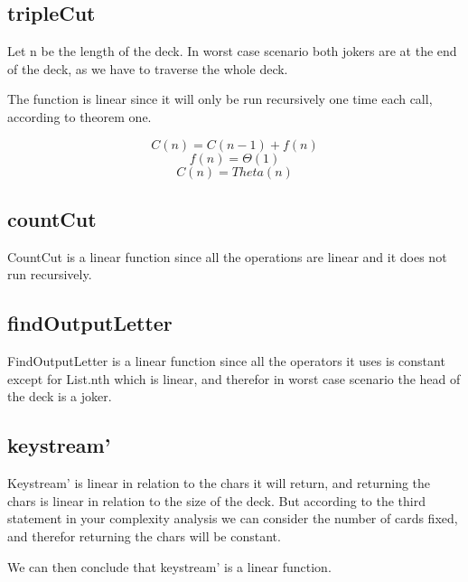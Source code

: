 \documentclass[12pt, a4paper]{article}
\begin{document}
\subsection{tripleCut}
Let n be the length of the deck. In worst case scenario both jokers are at the end of the deck, as we have to traverse the whole deck.

The function is linear since it will only be run recursively one time each call, according to theorem one.

$$C(n) = C(n-1) + f(n)$$
$$f(n) = \Theta(1)$$
$$ C(n) = Theta(n)$$

\subsection{countCut}
CountCut is a linear function since all the operations are linear and it does not run recursively.

\subsection{findOutputLetter}
FindOutputLetter is a linear function since all the operators it uses is constant except for List.nth which is linear, and therefor in worst case scenario the head of the deck is a joker.

\subsection{keystream'}
Keystream' is linear in relation to the chars it will return, and returning the chars is linear in relation to the size of the deck. But according to the third statement in your complexity analysis we can consider the number of cards fixed, and therefor returning the chars will be constant. 

We can then conclude that keystream' is a linear function.
\end{document}
